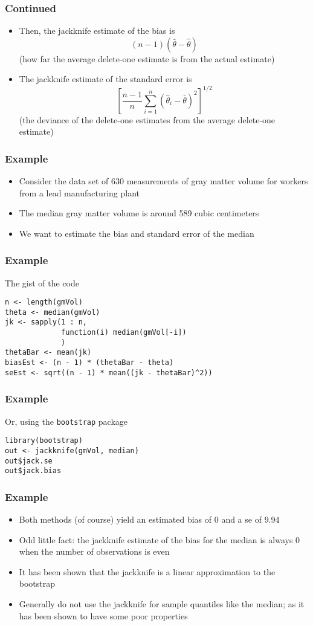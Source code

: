 \documentclass[aspectratio=169]{beamer}
\begin{document}
\begin{frame}\frametitle{Continued}
  \begin{itemize}
 \item Then, the jackknife estimate of the bias is
   $$
   (n - 1) \left(\bar \theta - \hat \theta\right)
   $$
   (how far the average delete-one estimate is from the actual estimate)
 \item The jackknife estimate of the standard error is
   $$
   \left[\frac{n-1}{n}\sum_{i=1}^n (\hat \theta_i - \bar\theta )^2\right]^{1/2}
   $$
   (the deviance of the delete-one estimates from the average delete-one estimate)
  \end{itemize}
\end{frame}

\begin{frame}\frametitle{Example}
\begin{itemize}
\item Consider the data set of $630$ measurements of gray matter volume
  for workers from a lead manufacturing plant
\item The median gray matter volume is around 589 cubic centimeters
\item We want to estimate the bias and standard error of the median
\end{itemize}
\end{frame}

\begin{frame}[fragile]\frametitle{Example}
The gist of the code
\begin{verbatim}
n <- length(gmVol)
theta <- median(gmVol)
jk <- sapply(1 : n,
             function(i) median(gmVol[-i])
             )
thetaBar <- mean(jk)
biasEst <- (n - 1) * (thetaBar - theta) 
seEst <- sqrt((n - 1) * mean((jk - thetaBar)^2))
\end{verbatim}
\end{frame}

\begin{frame}[fragile]\frametitle{Example}
Or, using the \texttt{bootstrap} package
\begin{verbatim}
library(bootstrap)
out <- jackknife(gmVol, median)
out$jack.se
out$jack.bias
\end{verbatim}
\end{frame}

\begin{frame}\frametitle{Example}
  \begin{itemize}
  \item Both methods (of course) yield an estimated bias of $0$ and a
    se of $9.94$
  \item Odd little fact: the jackknife estimate of the bias for the
    median is always $0$ when the number of observations is even
  \item It has been shown that the jackknife is a linear approximation to
    the bootstrap
  \item Generally do not use the jackknife for sample quantiles like the median;
    as it has been shown to have some poor properties
  \end{itemize}
\end{frame}
\end{document}
